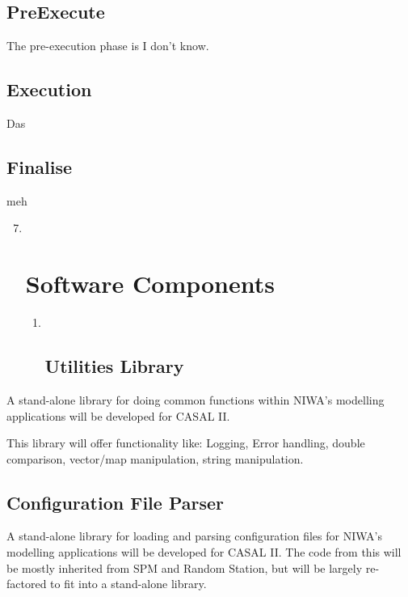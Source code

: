 \documentclass[a4paper,11pt,twoside,pdftex,draft]{article}
\begin{document}
\hypertarget{preexecute}{%
\subsection{PreExecute}\label{preexecute}}

The pre-execution phase is I don't know.

\hypertarget{execution}{%
\subsection{Execution}\label{execution}}

Das

\hypertarget{finalise}{%
\subsection{Finalise}\label{finalise}}

meh

\begin{enumerate}
\setcounter{enumi}{6}
\item ~
  \hypertarget{software-components}{%
  \section{Software Components}\label{software-components}}

  \begin{enumerate}
  \item ~
    \hypertarget{utilities-library}{%
    \subsection{Utilities Library}\label{utilities-library}}
  \end{enumerate}
\end{enumerate}

A stand-alone library for doing common functions within NIWA's modelling
applications will be developed for CASAL II.

This library will offer functionality like: Logging, Error handling,
double comparison, vector/map manipulation, string manipulation.

\hypertarget{configuration-file-parser}{%
\subsection{Configuration File Parser}\label{configuration-file-parser}}

A stand-alone library for loading and parsing configuration files for
NIWA's modelling applications will be developed for CASAL II. The code
from this will be mostly inherited from SPM and Random Station, but will
be largely re-factored to fit into a stand-alone library.
\end{document}
